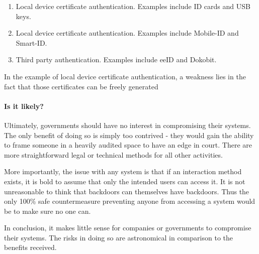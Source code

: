 \begin{enumerate}
    \item Local device certificate authentication. Examples include ID cards and USB keys.
    \item Local device certificate authentication. Examples include Mobile-ID and Smart-ID.
    \item Third party authentication. Examples include eeID and Dokobit.
\end{enumerate}

In the example of local device certificate authentication, a weakness lies in the fact that those certificates can be freely generated


\paragraph{Is it likely?} 

Ultimately, governments should have no interest in compromising their systems. The only benefit of doing so is simply too contrived - they would gain the ability to frame someone in a heavily audited space to have an edge in court. There are more straightforward legal or technical methods for all other activities.

More importantly, the issue with any system is that if an interaction method exists, it is bold to assume that only the intended users can access it. It is not unreasonable to think that backdoors can themselves have backdoors. Thus the only 100\% safe countermeasure preventing anyone from accessing a system would be to make sure no one can.

In conclusion, it makes little sense for companies or governments to compromise their systems. The risks in doing so are astronomical in comparison to the benefits received.